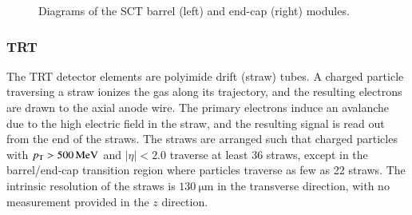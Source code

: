\begin{figure}[htbp]
	\centering
	\hfill
	\caption{Diagrams of the SCT barrel (left) and end-cap (right) modules.}
	\label{fig:ATLAS-SCT-modules}
\end{figure}


\subsubsection{TRT}\label{sec:ATLAS-id-trt}

The TRT detector elements are polyimide drift (straw) tubes. A charged particle traversing a straw ionizes the gas along its trajectory, and the resulting electrons are drawn to the axial anode wire. The primary electrons induce an avalanche due to the high electric field in the straw, and the resulting signal is read out from the end of the straws. The straws are arranged such that charged particles with $p_{\text{T}} > \SI{500}{\mega\electronvolt}$ and $|\eta|<2.0$ traverse at least 36 straws, except in the barrel/end-cap transition region where particles traverse as few as 22 straws. The intrinsic resolution of the straws is $\SI{130}{\micro\meter}$ in the transverse direction, with no measurement provided in the $z$ direction.


